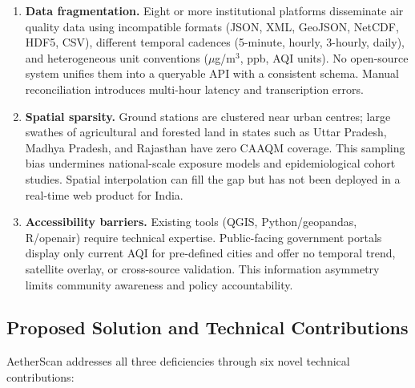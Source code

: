 \documentclass[12pt,a4paper]{article}
\begin{document}
\begin{enumerate}[leftmargin=*, label=\textbf{P\arabic*.}]

\item \textbf{Data fragmentation.} Eight or more institutional platforms
      disseminate air quality data using incompatible formats (JSON, XML,
      GeoJSON, NetCDF, HDF5, CSV), different temporal cadences (5-minute,
      hourly, 3-hourly, daily), and heterogeneous unit conventions
      ($\mu$g/m$^3$, ppb, AQI units). No open-source system unifies them
      into a queryable API with a consistent schema. Manual reconciliation
      introduces multi-hour latency and transcription errors.

\item \textbf{Spatial sparsity.} Ground stations are clustered near urban
      centres; large swathes of agricultural and forested land in states such
      as Uttar Pradesh, Madhya Pradesh, and Rajasthan have zero CAAQM coverage.
      This sampling bias undermines national-scale exposure models and
      epidemiological cohort studies. Spatial interpolation can fill the gap
      but has not been deployed in a real-time web product for India.

\item \textbf{Accessibility barriers.} Existing tools (QGIS, Python/geopandas,
      R/openair) require technical expertise. Public-facing government portals
      display only current AQI for pre-defined cities and offer no temporal
      trend, satellite overlay, or cross-source validation. This information
      asymmetry limits community awareness and policy accountability.

\end{enumerate}

\subsection{Proposed Solution and Technical Contributions}
\label{sec:intro:solution}

AetherScan addresses all three deficiencies through six novel technical
contributions:
\end{document}

